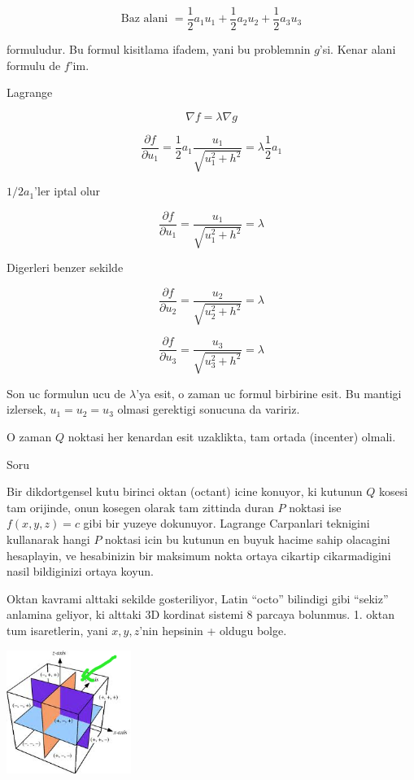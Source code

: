 \documentclass[12pt,fleqn]{article}\usepackage{../common}
\begin{document}
\[ \textrm{Baz alani } = 
\frac{1}{2}a_1u_1 +  
\frac{1}{2}a_2u_2 +  
\frac{1}{2}a_3u_3
\]

formuludur. Bu formul kisitlama ifadem, yani bu problemnin $g$'si. Kenar
alani formulu de $f$'im. 

Lagrange

\[ \nabla f = \lambda \nabla g \]

\[ \frac{\partial f}{\partial u_1} =
\frac{1}{2}a_1 \frac{u_1}{\sqrt{u_1^2 + h^2}} = 
\lambda \frac{1}{2}a_1
\]

$1/2a_1$'ler iptal olur

\[
\frac{\partial f}{\partial u_1} =
\frac{u_1}{\sqrt{u_1^2 + h^2}} = \lambda 
\]

Digerleri benzer sekilde

\[
\frac{\partial f}{\partial u_2} =
\frac{u_2}{\sqrt{u_2^2 + h^2}} = \lambda 
\]

\[
\frac{\partial f}{\partial u_3} =
\frac{u_3}{\sqrt{u_3^2 + h^2}} = \lambda 
\]

Son uc formulun ucu de $\lambda$'ya esit, o zaman uc formul birbirine
esit. Bu mantigi izlersek, $u_1 = u_2 = u_3$ olmasi gerektigi sonucuna da
variriz. 

O zaman $Q$ noktasi her kenardan esit uzaklikta, tam ortada (incenter)
olmali. 

Soru

Bir dikdortgensel kutu birinci oktan (octant) icine konuyor, ki kutunun $Q$
kosesi tam orijinde, onun kosegen olarak tam zittinda duran $P$ noktasi
ise $f(x,y,z)=c$ gibi bir yuzeye dokunuyor. Lagrange Carpanlari teknigini
kullanarak hangi $P$ noktasi icin bu kutunun en buyuk hacime sahip
olacagini hesaplayin, ve hesabinizin bir maksimum nokta ortaya cikartip
cikarmadigini nasil bildiginizi ortaya koyun. 

Oktan kavrami alttaki sekilde gosteriliyor, Latin ``octo'' bilindigi gibi
``sekiz'' anlamina geliyor, ki alttaki 3D kordinat sistemi 8 parcaya
bolunmus. 1. oktan tum isaretlerin, yani $x,y,z$'nin hepsinin + oldugu
bolge. 

\includegraphics[height=4cm]{octant.png}
\end{document}
